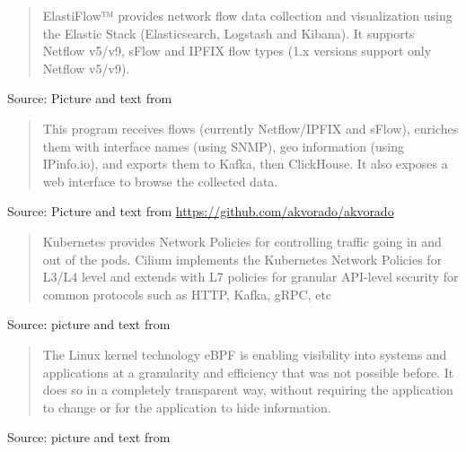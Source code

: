 \documentclass[Screen16to9,17pt]{foils}
\begin{document}


\begin{quote}
  ElastiFlow™ provides network flow data collection and visualization using the Elastic Stack (Elasticsearch, Logstash and Kibana). It supports Netflow v5/v9, sFlow and IPFIX flow types (1.x versions support only Netflow v5/v9).
\end{quote}
Source: Picture and text from  \\



\begin{quote}
This program receives flows (currently Netflow/IPFIX and sFlow), enriches them with interface names (using SNMP), geo information (using IPinfo.io), and exports them to Kafka, then ClickHouse. It also exposes a web interface to browse the collected data.
\end{quote}
Source: Picture and text from \url{https://github.com/akvorado/akvorado}




\begin{quote}
Kubernetes provides Network Policies for controlling traffic going in and out of the pods. Cilium implements the Kubernetes Network Policies for L3/L4 level and extends with L7 policies for granular API-level security for common protocols such as HTTP, Kafka, gRPC, etc
\end{quote}
Source: picture and text from 



\begin{quote}
The Linux kernel technology eBPF is enabling visibility into systems and applications at a granularity and efficiency that was not possible before. It does so in a completely transparent way, without requiring the application to change or for the application to hide information.
\end{quote}
Source: picture and text from 
\end{document}

